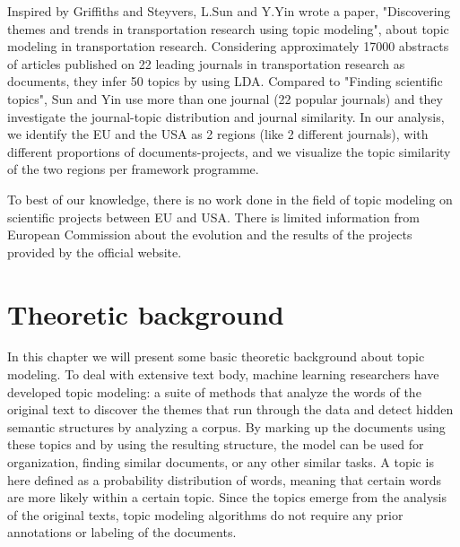 \documentclass[12pt]{report}
\begin{document}
Inspired by Griffiths and Steyvers, L.Sun and Y.Yin wrote a paper, "Discovering
themes and trends in transportation research using topic modeling",
\cite{Sun201749} about topic modeling in transportation research. 
Considering approximately 17000 abstracts of articles published on 22 
leading journals in transportation research as documents, they infer 50 
topics by using LDA. Compared to "Finding scientific topics", Sun and 
Yin use more than one journal (22 popular journals) and they
investigate the journal-topic distribution and journal similarity. In our
analysis, we identify the EU and the USA as 2 regions (like 2 different journals),
with different proportions of documents-projects, and we visualize the topic
similarity of the two regions per framework programme.

To best of our knowledge, there is no work done in the field of topic modeling
on scientific projects between EU and USA. There is limited information from
European Commission about the evolution and the results of the projects provided
by the official website.


\section{Theoretic background}

In this chapter we will present some basic theoretic background about topic
modeling. To deal with extensive text body, machine learning researchers have
developed topic modeling: a suite of methods that analyze the words of the
original text to discover the themes that run through the data and detect
hidden semantic structures by analyzing a corpus. By marking up the documents
using these topics and by using the resulting structure, the model can be used
for organization, finding similar documents, or any other similar tasks. A
topic is here defined as a probability distribution of words, meaning that
certain words are more likely within a certain topic. Since the topics emerge
from the analysis of the original texts, topic modeling algorithms do not
require any prior annotations or labeling of the documents.\cite{Blei11introductionto}
\end{document}
